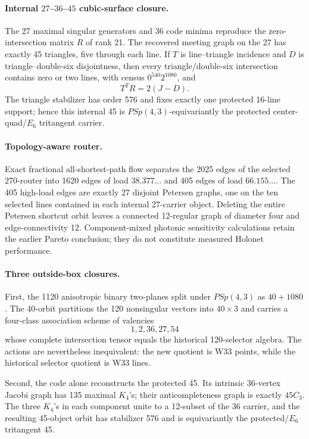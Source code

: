 \paragraph{Internal $27$--$36$--$45$ cubic-surface closure.}
The 27 maximal singular generators and 36 code minima reproduce the zero-intersection matrix $R$ of rank 21.  The recovered meeting graph on the 27 has exactly 45 triangles, five through each line.  If $T$ is line--triangle incidence and $D$ is triangle--double-six disjointness, then every triangle/double-six intersection contains zero or two lines, with census $0^{540}2^{1080}$, and
\[
T^TR=2(J-D).
\]
The triangle stabilizer has order 576 and fixes exactly one protected 16-line support; hence this internal 45 is $PSp(4,3)$-equivariantly the protected center-quad/$E_6$ tritangent carrier.

\paragraph{Topology-aware router.}
Exact fractional all-shortest-path flow separates the 2025 edges of the selected 270-router into 1620 edges of load $38.377\ldots$ and 405 edges of load $66.155\ldots$.  The 405 high-load edges are exactly 27 disjoint Petersen graphs, one on the ten selected lines contained in each internal 27-carrier object.  Deleting the entire Petersen shortcut orbit leaves a connected 12-regular graph of diameter four and edge-connectivity 12.  Component-mixed photonic sensitivity calculations retain the earlier Pareto conclusion; they do not constitute measured Holonet performance.

\paragraph{Three outside-box closures.}
First, the 1120 anisotropic binary two-planes split under $PSp(4,3)$ as $40+1080$.  The 40-orbit partitions the 120 nonsingular vectors into $40\times3$ and carries a four-class association scheme of valencies
\[
1,2,36,27,54
\]
whose complete intersection tensor equals the historical 120-selector algebra.  The actions are nevertheless inequivalent: the new quotient is W33 points, while the historical selector quotient is W33 lines.

Second, the code alone reconstructs the protected 45.  Its intrinsic 36-vertex Jacobi graph has 135 maximal $K_4$'s; their anticompleteness graph is exactly $45C_3$.  The three $K_4$'s in each component unite to a 12-subset of the 36 carrier, and the resulting 45-object orbit has stabilizer 576 and is equivariantly the protected/$E_6$ tritangent 45.

